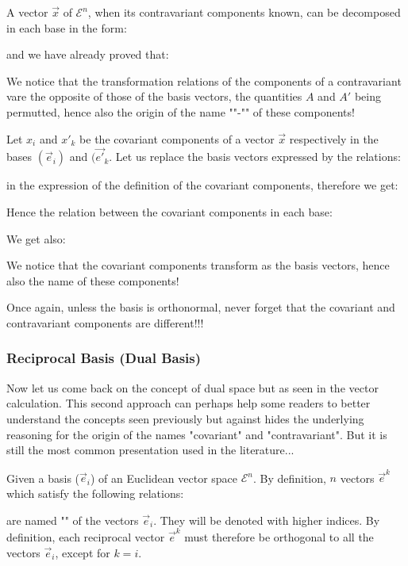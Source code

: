 	A vector $\vec{x}$ of $\mathcal{E}^n$, when its contravariant components known, can be decomposed in each base in the form:
	
	and we have already proved that:
	
	We notice that the transformation relations of the components of a contravariant vare the opposite of those of the basis vectors, the quantities $A$ and $A '$ being permutted, hence also the origin of the name ""-"" of these components!

	Let $x_i$ and ${x'}_k$ be the covariant components of a vector $\vec{x}$ respectively in the bases $(\vec{e}_i)$ and $(\vec{e'}_k$. Let us replace the basis vectors expressed by the relations:
	
	in the expression of the definition of the covariant components, therefore we get:
	
	Hence the relation between the covariant components in each base:
	
	We get also:
	
	We notice that the covariant components transform as the basis vectors, hence also the name of these components!
	
	Once again, unless the basis is orthonormal, never forget that the covariant and contravariant components are different!!!
	
	\subsubsection{Reciprocal Basis (Dual Basis)}
	Now let us come back on the concept of dual space but as seen in the vector calculation. This second approach can perhaps help some readers to better understand the concepts seen previously but against hides the underlying reasoning for the origin of the names "covariant" and "contravariant". But it is still the most common presentation used in the literature...
	
	Given a basis ($\vec{e}_i$) of an Euclidean vector space $\mathcal{E}^n$. By definition, $n$ vectors $\vec{e}^k$ which satisfy the following relations:
	
	are named "" of the vectors $\vec{e}_i$. They will be denoted with higher indices. By definition, each reciprocal vector $\vec{e}^k$ must therefore be orthogonal to all the vectors $\vec{e}_i$, except for $k=i$.
	
